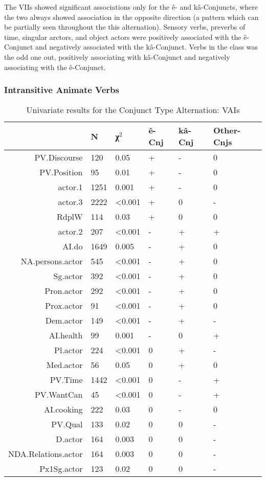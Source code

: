 The VIIs showed significant associations only for the ê- and kâ-Conjuncts, where the two always showed association in the opposite direction (a pattern which can be partially seen throughout the this alternation). Sensory verbs, preverbs of time, singular arctors, and object actors were positively associated with the ê-Conjunct and negatively associated with the kâ-Conjunct. Verbs in the  class was the odd one out, positively associating with kâ-Conjunct and negatively associating with the ê-Conjunct. 

\FloatBarrier

\FloatBarrier

\subsubsection{Intransitive Animate Verbs}

\begin{table}[H]
  \centering
  \footnotesize
\begin{tabular}{rlllll}
    \toprule
 & N & χ$^{2}$ & ê-Cnj & kâ-Cnj & Other-Cnjs \\
\midrule
PV.Discourse & 120 & 0.05 & + & - & 0 \\
PV.Position & 95 & 0.01 & + & - & 0 \\
actor.1 & 1251 & 0.001 & + & - & 0 \\
actor.3 & 2222 & \textless{}0.001 & + & 0 & - \\
RdplW & 114 & 0.03 & + & 0 & 0 \\
actor.2 & 207 & \textless{}0.001 & - & + & + \\
AI.do & 1649 & 0.005 & - & + & 0 \\
NA.persons.actor & 545 & \textless{}0.001 & - & + & 0 \\
Sg.actor & 392 & \textless{}0.001 & - & + & 0 \\
Pron.actor & 292 & \textless{}0.001 & - & + & 0 \\
Prox.actor & 91 & \textless{}0.001 & - & + & 0 \\
Dem.actor & 149 & \textless{}0.001 & - & + & - \\
AI.health & 99 & 0.001 & - & 0 & + \\
Pl.actor & 224 & \textless{}0.001 & 0 & + & - \\
Med.actor & 56 & 0.05 & 0 & + & 0 \\
PV.Time & 1442 & \textless{}0.001 & 0 & - & + \\
PV.WantCan & 45 & \textless{}0.001 & 0 & - & + \\
AI.cooking & 222 & 0.03 & 0 & - & 0 \\
PV.Qual & 133 & 0.02 & 0 & 0 & - \\
D.actor & 164 & 0.003 & 0 & 0 & - \\
NDA.Relations.actor & 164 & 0.003 & 0 & 0 & - \\
Px1Sg.actor & 123 & 0.02 & 0 & 0 & - \\
  \bottomrule
  \end{tabular}
  \caption{
   Univariate results for the Conjunct Type Alternation: VAIs \\ \label{tab:aicnjuni}
  }
\end{table}

